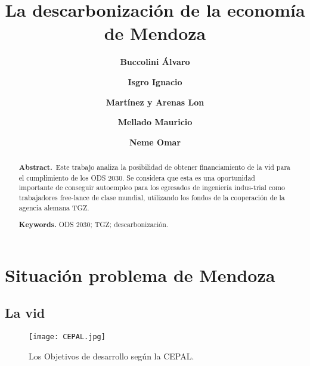 \documentclass{rbfin}
\begin{document}
\frenchspacing



\title{La descarbonización de la economía de Mendoza}

\author{
\bf{Buccolini Álvaro }%
\and
\bf{Isgro Ignacio }%
\and
\bf{Martínez y Arenas Lon }%
  \and
\bf{Mellado Mauricio }%
 \and
\bf{Neme Omar }%
}
\maketitle
{}

\begin{abstract}
\textbf{Abstract.}\ 
Este trabajo analiza la posibilidad de obtener financiamiento de la vid para el cumplimiento de los ODS 2030. Se considera que esta es una oportunidad importante de conseguir autoempleo para los egresados de ingeniería indus-trial como trabajadores free-lance de clase mundial, utilizando los fondos de la cooperación de la agencia alemana TGZ.

\textbf{Keywords.}
ODS 2030;
TGZ;
descarbonización.\\

\end{abstract}


\section{Situación problema de Mendoza}\label{sec-intro}
 
 \lipsum[1-7]

\subsection{La vid}

\lipsum[1-2]

\begin{figure}
\texttt{[image: CEPAL.jpg]}
 \caption{Los Objetivos de desarrollo según la CEPAL.}
  \label{fig:boat1}
\end{figure}

\lipsum[1-30]
\end{document}
